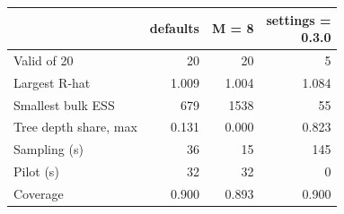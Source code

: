 \begin{tabular*}{\linewidth}{@{\extracolsep{\fill}}lrrr@{}}
\toprule
 & defaults & M = 8 & \shortstack{settings =\\0.3.0} \\
\midrule
Valid of 20 & 20 & 20 &  5 \\
Largest R-hat & 1.009 & 1.004 & 1.084 \\
Smallest bulk ESS & 679 & 1538 & 55 \\
Tree depth share, max & 0.131 & 0.000 & 0.823 \\
Sampling (s) & 36 & 15 & 145 \\
Pilot (s) & 32 & 32 & 0 \\
Coverage & 0.900 & 0.893 & 0.900 \\
\bottomrule
\end{tabular*}
